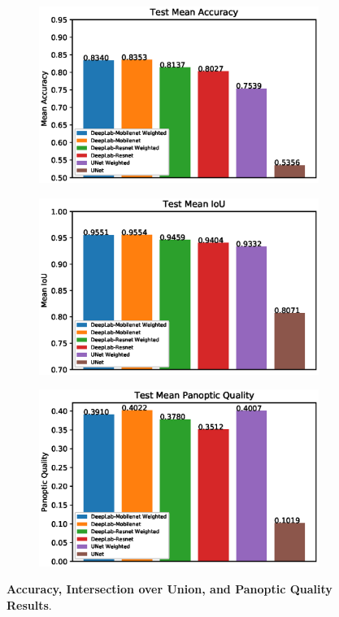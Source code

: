 \documentclass[journal]{IEEEtran}
\begin{document}
\begin{figure}
\centering
\begin{subfigure}[b]{\linewidth}
\includegraphics[width=\linewidth]{graphs/Test-Mean-Accuracy.eps}
\end{subfigure}
\begin{subfigure}[b]{\linewidth}
\includegraphics[width=\linewidth]{graphs/Test-Mean-IoU.eps}
\end{subfigure}
\begin{subfigure}[b]{\linewidth}
\includegraphics[width=\linewidth]{graphs/Test-Mean-Panoptic-Quality.eps}
\end{subfigure}
\caption{\textbf{Accuracy, Intersection over Union, and Panoptic Quality Results}.}
\label{fig:graph_results}
\end{figure}
\end{document}
